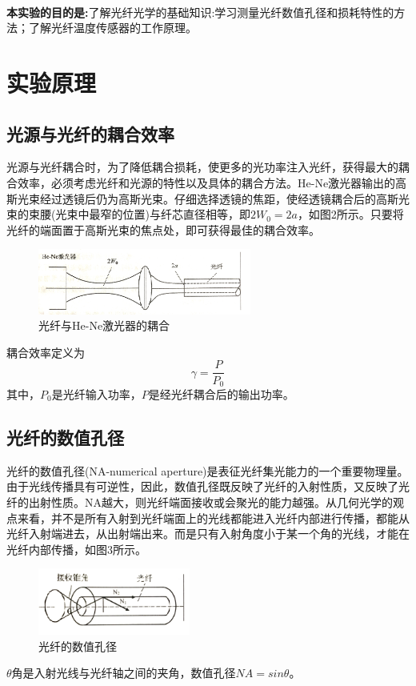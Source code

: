 \documentclass[UTF8]{ctexart}
\begin{document}
\begin{multicols}{2}
~\\
\noindent\textbf{本实验的目的是:}了解光纤光学的基础知识:学习测量光纤数值孔径和损耗特性的方法；了解光纤温度传感器的工作原理。

\section{实验原理}
\subsection{光源与光纤的耦合效率}
光源与光纤耦合时，为了降低耦合损耗，使更多的光功率注入光纤，获得最大的耦合效率，必须考虑光纤和光源的特性以及具体的耦合方法。He-Ne激光器输出的高斯光束经过透镜后仍为高斯光束。仔细选择透镜的焦距，使经透镜耦合后的高斯光束的束腰(光束中最窄的位置)与纤芯直径相等，即$2W_0=2a$，如图2所示。只要将光纤的端面置于高斯光束的焦点处，即可获得最佳的耦合效率。
\begin{figure}[H]
\centering
\includegraphics[width=7cm]{interact}
\caption{光纤与He-Ne激光器的耦合}
\end{figure}
耦合效率定义为
\begin{equation}
\gamma=\frac{P}{P_0}
\end{equation}
其中，$P_0$是光纤输入功率，$P$是经光纤耦合后的输出功率。

\subsection{光纤的数值孔径}
光纤的数值孔径(NA-numerical aperture)是表征光纤集光能力的一个重要物理量。由于光线传播具有可逆性，因此，数值孔径既反映了光纤的入射性质，又反映了光纤的出射性质。NA越大，则光纤端面接收或会聚光的能力越强。从几何光学的观点来看，并不是所有入射到光纤端面上的光线都能进入光纤内部进行传播，都能从光纤入射端进去，从出射端出来。而是只有入射角度小于某一个角的光线，オ能在光纤内部传播，如图3所示。
\begin{figure}[H]
\centering
\includegraphics[width=5cm]{NA}
\caption{光纤的数值孔径}
\end{figure}
$\theta$角是入射光线与光纤轴之间的夹角，数值孔径$NA=sin\theta$。


\end{multicols}
\end{document}
